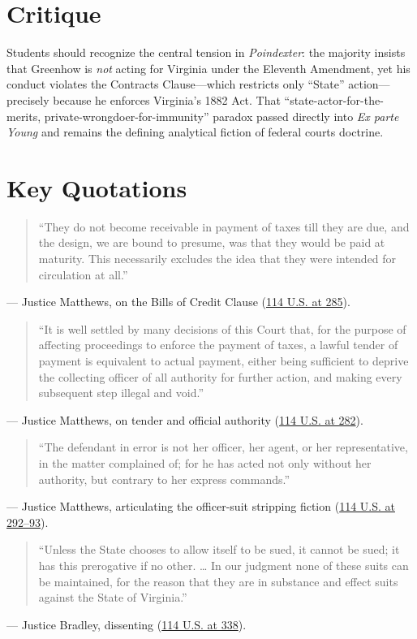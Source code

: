 \documentclass[12pt]{article}
\begin{document}
\section{Critique}
Students should recognize the central tension in \textit{Poindexter}: the majority insists that Greenhow is \emph{not} acting for Virginia under the Eleventh Amendment, yet his conduct violates the Contracts Clause---which restricts only ``State'' action---precisely because he enforces Virginia's 1882 Act. That ``state-actor-for-the-merits, private-wrongdoer-for-immunity'' paradox passed directly into \textit{Ex parte Young} and remains the defining analytical fiction of federal courts doctrine.

\section{Key Quotations}
\begin{quote}
``They do not become receivable in payment of taxes till they are due, and the design, we are bound to presume, was that they would be paid at maturity. This necessarily excludes the idea that they were intended for circulation at all.''
\end{quote}
\noindent --- Justice Matthews, on the Bills of Credit Clause (\href{https://supreme.justia.com/cases/federal/us/114/270/}{114 U.S. at 285}).

\begin{quote}
``It is well settled by many decisions of this Court that, for the purpose of affecting proceedings to enforce the payment of taxes, a lawful tender of payment is equivalent to actual payment, either being sufficient to deprive the collecting officer of all authority for further action, and making every subsequent step illegal and void.''
\end{quote}
\noindent --- Justice Matthews, on tender and official authority (\href{https://supreme.justia.com/cases/federal/us/114/270/}{114 U.S. at 282}).

\begin{quote}
``The defendant in error is not her officer, her agent, or her representative, in the matter complained of; for he has acted not only without her authority, but contrary to her express commands.''
\end{quote}
\noindent --- Justice Matthews, articulating the officer-suit stripping fiction (\href{https://caselaw.findlaw.com/court/us-supreme-court/114/270.html}{114 U.S. at 292--93}).

\begin{quote}
``Unless the State chooses to allow itself to be sued, it cannot be sued; it has this prerogative if no other. \dots{} In our judgment none of these suits can be maintained, for the reason that they are in substance and effect suits against the State of Virginia.''
\end{quote}
\noindent --- Justice Bradley, dissenting (\href{https://supreme.justia.com/cases/federal/us/114/325/}{114 U.S. at 338}).
\end{document}
